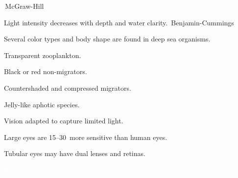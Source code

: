 \documentclass[t]{beamer}
\begin{document}
{
\begin{frame}[b]
\tiny\textcopyright\,McGraw-Hill
\end{frame}}

{
\begin{frame}[b]{Light intensity decreases with depth and water clarity.}
\tiny\textcopyright\,Benjamin-Cummings
\end{frame}}

{
\begin{frame}[t]{Several color types and body shape are found in deep sea organisms.}

\vspace*{-\baselineskip}

\hangpara Transparent zooplankton.

\hangpara Black or red non-migrators.

\hangpara\parbox{0.45\textwidth}{Countershaded and compressed migrators.}

\hangpara Jelly-like aphotic species.

\end{frame}}


{
\begin{frame}[t]{Vision adapted to capture limited light.}

	\hangpara\parbox{0.48\textwidth}{Large eyes are 15–30\times\ more sensitive than human eyes.}

	\hangpara\parbox{0.48\textwidth}{Tubular eyes may have dual lenses and retinas.}

\end{frame}}

{
\begin{frame}[t]{\textcolor{white}{Bioluminescence is chemical light produced by living organisms.}}

\end{frame}}

{
\begin{frame}[c]

	\begin{center}
	\end{center}
	
\end{frame}}
\end{document}
